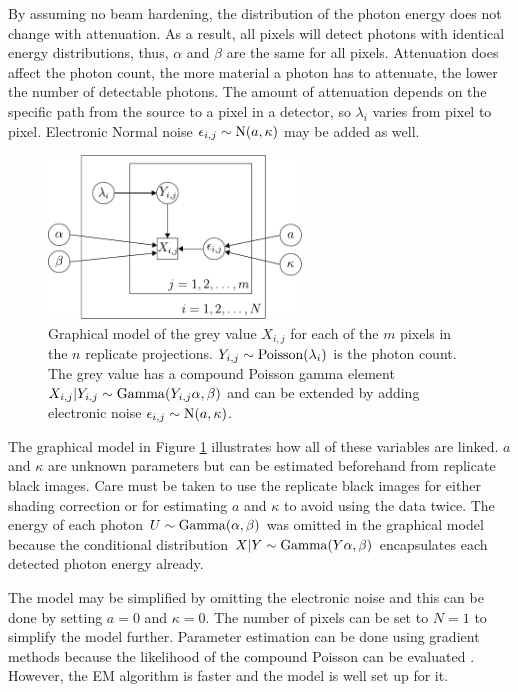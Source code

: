 By assuming no beam hardening, the distribution of the photon energy does not change with attenuation. As a result, all pixels will detect photons with identical energy distributions, thus, $\alpha$ and $\beta$ are the same for all pixels. Attenuation does affect the photon count, the more material a photon has to attenuate, the lower the number of detectable photons. The amount of attenuation depends on the specific path from the source to a pixel in a detector, so $\lambda_i$ varies from pixel to pixel. Electronic Normal noise $\epsilon_{i,j}\sim\operatorname{N}(a,\kappa)$ may be added as well.

\begin{figure}
  \centering
  \includegraphics[width=0.6\textwidth]{../figures/compoundpoisson/graphicalModel.pdf}
  \caption{Graphical model of the grey value $X_{i,j}$ for each of the $m$ pixels in the $n$ replicate projections. $Y_{i,j}\sim\operatorname{Poisson}(\lambda_i)$ is the photon count. The grey value has a compound Poisson gamma element $X_{i,j}|Y_{i,j}\sim\operatorname{Gamma}(Y_{i,j}\alpha,\beta)$ and can be extended by adding electronic noise $\epsilon_{i,j}\sim\operatorname{N}(a,\kappa)$.}
  \label{fig:compoundPoisson_graphicalModel}
\end{figure}

The graphical model in Figure \ref{fig:compoundPoisson_graphicalModel} illustrates how all of these variables are linked. $a$ and $\kappa$ are unknown parameters but can be estimated beforehand from replicate black images. Care must be taken to use the replicate black images for either shading correction or for estimating $a$ and $\kappa$ to avoid using the data twice. The energy of each photon $U\sim\operatorname{Gamma}(\alpha,\beta)$ was omitted in the graphical model because the conditional distribution $X|Y\sim\operatorname{Gamma}(Y\alpha,\beta)$ encapsulates each detected photon energy already.

The model may be simplified by omitting the electronic noise and this can be done by setting $a=0$ and $\kappa=0$. The number of pixels can be set to $N=1$ to simplify the model further. Parameter estimation can be done using gradient methods because the likelihood of the compound Poisson can be evaluated \citep{dunn2005series}. However, the EM algorithm is faster and the model is well set up for it.

